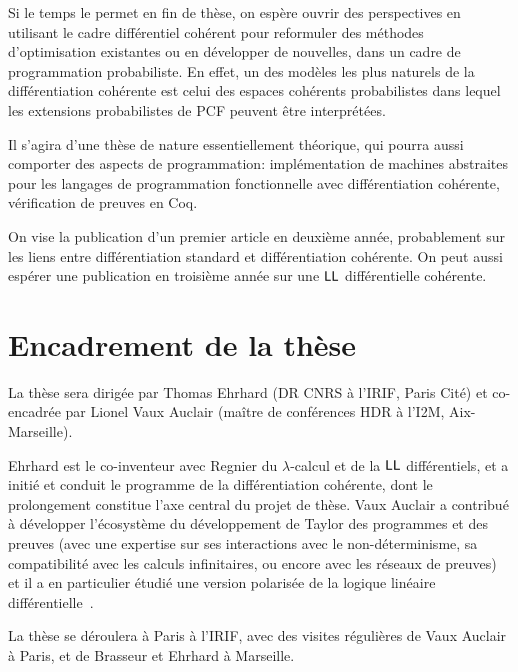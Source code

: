 \documentclass[a4]{article}
\begin{document}
Si le temps le permet en fin de thèse, on espère ouvrir des
perspectives en utilisant le cadre différentiel cohérent pour
reformuler des méthodes d'optimisation existantes ou en développer de
nouvelles, dans un cadre de programmation probabiliste.
%
En effet, un des modèles les plus naturels de la différentiation
cohérente est celui des espaces cohérents probabilistes dans lequel
les extensions probabilistes de PCF peuvent être interprétées.

Il s'agira d'une thèse de nature essentiellement théorique, qui pourra
aussi comporter des aspects de programmation: implémentation de
machines abstraites pour les langages de programmation fonctionnelle
avec différentiation cohérente, vérification de preuves en Coq.

On vise la publication d'un premier article en deuxième année,
probablement sur les liens entre différentiation standard et
différentiation cohérente.
%
On peut aussi espérer une publication en troisième année sur une $\hbox{\textsf{LL}}$
différentielle cohérente.

\section{Encadrement de la thèse}

La thèse sera dirigée par Thomas Ehrhard (DR CNRS à l’IRIF, Paris
Cité) et co-encadrée par Lionel Vaux Auclair (maître de conférences HDR à
l’I2M, Aix-Marseille).

Ehrhard est le co-inventeur avec Regnier du $\lambda$-calcul et de la $\hbox{\textsf{LL}}$
différentiels, et a initié et conduit le programme de la différentiation
cohérente, dont le prolongement constitue l’axe central du projet de thèse.
Vaux Auclair a contribué à développer l’écosystème du développement de Taylor
des programmes et des preuves (avec une expertise sur ses interactions avec le
non-déterminisme, sa compatibilité avec les calculs infinitaires, 
ou encore avec les réseaux de preuves) et il a en particulier étudié une
version polarisée de la logique linéaire diffé\-ren\-tielle~\cite{Vaux09a}.

La thèse se déroulera à Paris à l’IRIF, avec des visites régulières de Vaux
Auclair à Paris, et de Brasseur et Ehrhard à Marseille.



\end{document}
